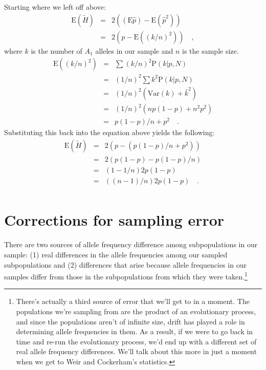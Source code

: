 Starting where we left off above:
\begin{eqnarray*}
\mbox{E}(\tilde H) &=& 2\left((\mbox{E}\hat p) - \mbox{E}({\hat p}^2)\right) \\
     &=& 2\left(p - \mbox{E}\left((k/n)^2\right)\right) \quad ,
\end{eqnarray*}
where $k$ is the number of $A_1$ alleles in our sample and $n$ is the
sample size.
\begin{eqnarray*}
\mbox{E}\left((k/n)^2\right) &=& \sum (k/n)^2 \mbox{P}(k|p,N) \\
                      &=& (1/n)^2 \sum k^2 \mbox{P}(k|p,N) \\
                      &=& (1/n)^2 \left(\mbox{Var}(k) + \bar k^2\right) \\
                      &=& (1/n)^2 \left(np(1-p) + n^2p^2\right) \\
                      &=& p(1-p)/n + p^2 \quad .
\end{eqnarray*}
Substituting this back into the equation above yields the following:
\begin{eqnarray*}
\mbox{E}(\tilde H) &=& 2\left(p - \left(p(1-p)/n + p^2\right)\right) \\
     &=& 2\left(p(1-p) - p(1-p)/n\right) \\
     &=& \left(1 - 1/n\right)2p(1-p) \\
     &=& ((n-1)/n)2p(1-p) \quad . \\
\end{eqnarray*}

\section*{Corrections for sampling error}

There are two sources of allele frequency difference among
subpopulations in our sample: (1) real differences in the allele
frequencies among our sampled subpopulations and (2) differences that
arise because allele frequencies in our samples differ from those in
the subpopulations from which they were taken.\footnote{There's
  actually a third source of error that we'll get to in a moment. The
  populations we're sampling from are the product of an evolutionary
  process, and since the populations aren't of infinite size, drift
  has played a role in determining allele frequencies in them. As a
  result, if we were to go back in time and re-run the evolutionary
  process, we'd end up with a different set of real allele frequency
  differences. We'll talk about this more in just a moment when we get
  to Weir and Cockerham's statistics.}

